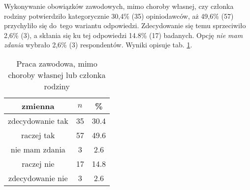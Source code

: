

Wykonywanie obowiązków zawodowych, mimo choroby własnej, czy członka rodziny potwierdziło kategorycznie 30,4\% (35) opiniodawców, aż 49,6\% (57) przychyliło się do~tego wariantu odpowiedzi. Zdecydowanie się temu sprzeciwiło 2,6\% (3), a skłania się ku tej odpowiedzi 14.8\% (17) badanych. Opcję \textit{nie mam zdania} wybrało 2,6\% (3) respondentów.
Wyniki opisuje tab. \ref{tab:Q31}.


\begin{table}[H]
\caption{Praca zawodowa, mimo choroby własnej lub członka rodziny}
\centering
\begin{tabular}{ | c | c | c |}
\hline
zmienna & $n$ & \% \\
\hline
zdecydowanie tak  &  35  & 30.4\\
\hline
raczej tak  &  57  & 49.6\\
\hline
nie mam zdania  &  3  & 2.6\\
\hline
raczej nie  &  17  & 14.8 \\
\hline
zdecydowanie nie  &  3  & 2.6 \\
\hline
\end{tabular}
\label{tab:Q31}
\end{table}
